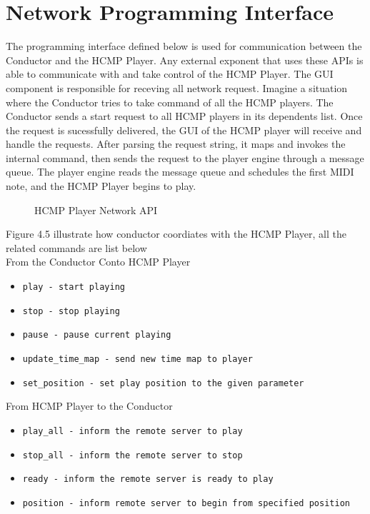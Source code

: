 \section{Network Programming Interface}
The programming interface defined below is used for communication 
between the Conductor and the HCMP Player. Any external exponent that  
uses these APIs is able to communicate with and take control of the 
HCMP Player. The GUI component is responsible for receving all 
network request. Imagine a situation where the Conductor 
tries to take command of all the HCMP players. The Conductor sends a start
request to all HCMP players in its dependents list.
Once the request is sucessfully delivered, the GUI of the HCMP player will 
receive and handle the requests. After parsing the request string, 
it maps and invokes the internal command, then sends the request to the player 
engine through a message queue. The player engine reads the message queue and
schedules the first MIDI note, and the HCMP Player begins to play.

\begin{figure}[H]
\caption{HCMP Player Network API}
\label{fig:speciation}
\end{figure}
Figure 4.5 illustrate how conductor coordiates with the HCMP Player, all the  
related commands are list below \\

From the Conductor Conto HCMP Player
\begin{itemize}
  \item \texttt{play - start playing}  
  \item \texttt{stop - stop playing}
  \item \texttt{pause - pause current playing}
  \item \texttt{update\_time\_map - send new time map to player}  
  \item \texttt{set\_position - set play position to the given parameter}
\end{itemize}

From HCMP Player to the Conductor 
\begin{itemize}
  \item \texttt{play\_all - inform the remote server to play}  
  \item \texttt{stop\_all - inform the remote server to stop}  
  \item \texttt{ready - inform the remote server is ready to play}
  \item \texttt{position - inform remote server to begin from specified position}
\end{itemize}
